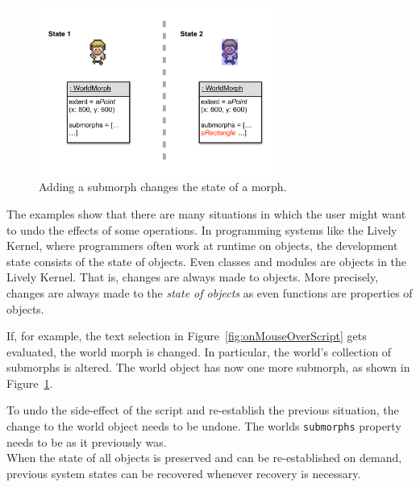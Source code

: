 \begin{figure}[h]
    \centering
    \includegraphics[width=0.7\textwidth]{figures/3_motivation/5_stateChanges.pdf}
    \caption{Adding a submorph changes the state of a morph.}
    \label{fig:changedCharacter}
\end{figure}

The examples show that there are many situations in which the user might want to undo the effects of some operations.
In programming systems like the Lively Kernel, where programmers often work at runtime on objects, the development state consists of the state of objects.
Even classes and modules are objects in the Lively Kernel.
That is, changes are always made to objects.
More precisely, changes are always made to the \emph{state of objects} as even functions are properties of objects.

If, for example, the text selection in Figure~\ref{fig:onMouseOverScript} gets evaluated, the world morph is changed.
In particular, the world's collection of submorphs is altered.
The world object has now one more submorph, as shown in Figure~\ref{fig:changedCharacter}.

To undo the side-effect of the script and re-establish the previous situation, the change to the world object needs to be undone.
The worlds \lstinline{submorphs} property needs to be as it previously was.\\
When the state of all objects is preserved and can be re-established on demand, previous system states can be recovered whenever recovery is necessary.
